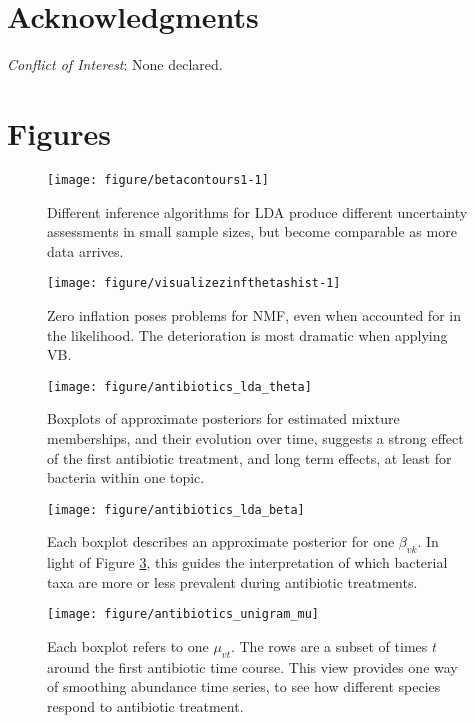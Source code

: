 \documentclass[oupdraft]{bio}
\begin{document}
\section*{Acknowledgments}

{\it Conflict of Interest}: None declared.




\section{Figures}

\begin{figure}[!p]
  \centering\texttt{[image: figure/betacontours1-1]}
  \caption{Different inference algorithms for LDA produce different uncertainty
    assessments in small sample sizes, but become comparable as more data arrives.}
  \label{fig:lda_contours}
\end{figure}

\begin{figure}[!p]
  \centering\texttt{[image: figure/visualizezinfthetashist-1]}
  \caption{Zero inflation poses problems for NMF, even when accounted for in the
    likelihood. The deterioration is most dramatic when applying VB.}
  \label{fig:zinf_thetas}
\end{figure}

\begin{figure}[!p]
  \centering\texttt{[image: figure/antibiotics\_lda\_theta]}
  \caption{Boxplots of approximate posteriors for estimated mixture memberships,
    and their evolution over time, suggests a strong effect of the first
    antibiotic treatment, and long term effects, at least for bacteria within
    one topic.}
  \label{fig:antibiotics_lda_theta}
\end{figure}

\begin{figure}[!p]
  \centering\texttt{[image: figure/antibiotics\_lda\_beta]}
  \caption{Each boxplot describes an approximate posterior for one $\beta_{vk}$.
    In light of Figure \ref{fig:antibiotics_lda_theta}, this guides the
    interpretation of which bacterial taxa are more or less prevalent during
    antibiotic treatments.}
  \label{fig:antibiotics_lda_beta}
\end{figure}

\begin{figure}[!p]
  \centering
  \texttt{[image: figure/antibiotics\_unigram\_mu]}
  \caption{Each boxplot refers to one $\mu_{vt}$. The rows are a subset of times
    $t$ around the first antibiotic time course. This view provides one way of
    smoothing abundance time series, to see how different species respond to
    antibiotic treatment. \label{fig:antibiotics_unigram_theta} }
\end{figure}
\end{document}
